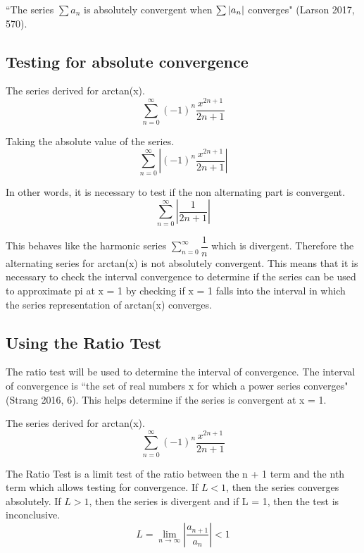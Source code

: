 \documentclass[12pt, titlepage]{article}
\begin{document}
``The series \(\sum a_{n}\) is absolutely convergent when \(\sum \abs{a_{n}}\) converges" (Larson 2017, 570).

\subsection{Testing for absolute convergence}
The series derived for arctan(x).
\begin{equation}
    \sum_{n=0}^{\infty} (-1)^{n} \frac{x^{2n+1}}{2n+1}
\end{equation}

Taking the absolute value of the series.
\begin{equation}
    \sum_{n=0}^{\infty}   \left |  (-1)^{n} \frac{x^{2n+1}}{2n+1} \right |
\end{equation}

In other words, it is necessary to test if the non alternating part is convergent.
\begin{equation}
    \sum_{n=0}^{\infty}   \left |\frac{1}{2n+1} \right |
\end{equation}

This behaves like the harmonic series \(\sum\limits_{n=0}^{\infty} \dfrac{1}{n}\) which is divergent. Therefore the alternating series for arctan(x) is not absolutely convergent. This means that it is necessary to check the interval convergence to determine if the series can be used to approximate pi at x = 1 by checking if x = 1 falls into the interval in which the series representation of arctan(x) converges.

\subsection{Using the Ratio Test}
The ratio test will be used to determine the interval of convergence. The interval of convergence is ``the set of real numbers x for which a power series converges" (Strang 2016, 6). This helps determine if the series is convergent at x = 1.

The series derived for arctan(x).
\begin{equation}
    \sum_{n=0}^{\infty} (-1)^{n} \frac{x^{2n+1}}{2n+1}
\end{equation}
 
The Ratio Test is a limit test of the ratio between the n + 1 term and the nth term which allows testing for convergence. If \(L < 1\), then the series converges absolutely. If \(L > 1\), then the series is divergent and if L = 1, then the test is inconclusive.
\begin{equation}
    L = \lim_{n \to \infty} \left |\frac{a_{n+1}}{a_{n}} \right | < 1
\end{equation}
\end{document}
